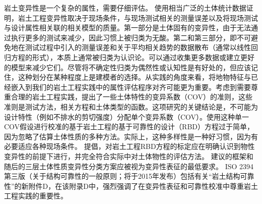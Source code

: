\begin{paracol}{2}
    \switchcolumn

    岩土变异性是一个复杂的属性，需要仔细评估。 \citet{Phoon1999612}使用相当广泛的土体统计数据证明，岩土工程变异性取决于现场条件，与现场测试相关的测量误差以及将现场测试与设计属性相关联的相关模型的质量。第一部分是土体固有的变异性，由于无法通过执行更多的测试来减少，因此习惯上被归类为无酸。第二和第三部分，即不可避免地在测试过程中引入的测量误差和关于平均相关趋势的数据散布（通常以线性回归方程的形式），本质上通常被归类为认识论。可以通过收集更多数据或建立更好的模型来减少它们。尽管将不确定性归类为偶然性或认知性是有好处的，但应该记住，这种划分在某种程度上是建模者的选择\citep{DerKiureghian2007}。从实践的角度来看，将地物特征与已经嵌入到我们的岩土工程实践中的属性评估程序对齐可能更为重要。考虑到需要尊重合理的岩土工程实践，\citet{Phoon1999625}提出了一些土体特性的变异系数（COV）的准则，这些准则是测试方法，相关方程和土体类型的函数。这项研究的关键结论是，不可能为设计特性（例如不排水的剪切强度）分配单个变异系数（COV）。使用这种单一COV假设进行校准的基于岩土工程的基于可靠性的设计（RBD）方程过于简单，因为忽略了估算土体性质的多种方法。实际上，这种多样性是一种好习惯，因为有必要适应各种现场条件。 \citet{Phoon1999612,Phoon1999625}提倡，对岩土工程RBD方程的标定应在明确认识到物性变异性的前提下进行，并完全符合实际中对土体物性的评估方法。 \citet{Phoon1999612,Phoon1999625}建议的框架和随后的三层土体性质变异性分类方案\citep{Phoon2008344}应被视为变异性表征的最低要求。 ISO 2394第三版（关于结构可靠性的一般原则；将于2015年发布）包括有关“岩土结构可靠性”的新附件D，在该附录D中，强烈强调了在变异性表征和可靠性校准中尊重岩土工程实践的重要性。

    \switchcolumn*


\end{paracol}
